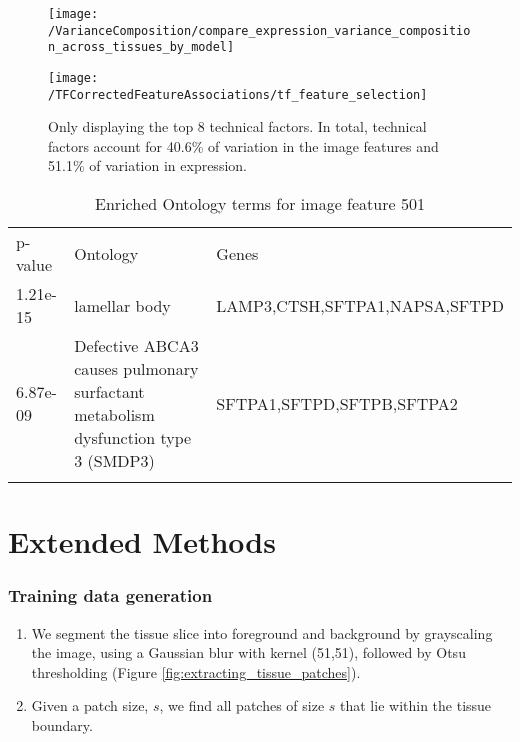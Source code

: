 \documentclass{article}
\begin{document}
\begin{figure}[H]
  \centering
    \texttt{[image: /VarianceComposition/compare\_expression\_variance\_composition\_across\_tissues\_by\_model]} 
  \caption{}
\end{figure}

\begin{figure}[H]
    \centering
      \texttt{[image: /TFCorrectedFeatureAssociations/tf\_feature\_selection]} 
        \caption{Only displaying the top 8 technical factors. In total, technical factors account for 40.6\% of variation in the image features and 51.1\% of variation in expression.}
\end{figure}


\begin{table}[H]
\caption{Enriched Ontology terms for image feature 501}
\label{tab:image_feature_pcs_and_tfs}       %

\begin{tabular}{p{2cm}p{6cm}p{6cm}}
\hline\noalign{\smallskip}
p-value & Ontology & Genes  \\
1.21e-15 & lamellar body & LAMP3,CTSH,SFTPA1,NAPSA,SFTPD  \\
6.87e-09 & Defective ABCA3 causes pulmonary surfactant metabolism dysfunction type 3 (SMDP3) & SFTPA1,SFTPD,SFTPB,SFTPA2 \\


\noalign{\smallskip}\hline\noalign{\smallskip}
\end{tabular}
\end{table}

\section{Extended Methods}

\subsubsection{Training data generation}

\begin{enumerate}
\item We segment the tissue slice into foreground and background by grayscaling the image, using a Gaussian blur \cite{shapiro-computer-vision} with kernel (51,51), followed by Otsu thresholding \cite{otsu-method} (Figure \ref{fig:extracting_tissue_patches}).
\item Given a patch size, $s$, we find all patches of size $s$ that lie within the tissue boundary. 
\end{enumerate}
\end{document}
